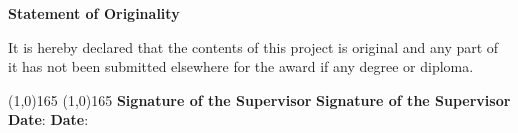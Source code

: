 \begin{center}
{\Large \textbf{Statement of Originality}}
\end{center}

\vspace{10mm}
\justify
It is hereby declared that the contents of this project is original and any part of it has not been submitted elsewhere for the award if any degree or diploma.

\vspace{50mm}

\justify
\line(1,0){165} \hfill \line(1,0){165} \newline
\textbf{Signature of the Supervisor}	 \hfill \textbf{Signature of the Supervisor}	\newline
\textbf{Date}:  \hspace{74.5mm} \textbf{Date}: \newline